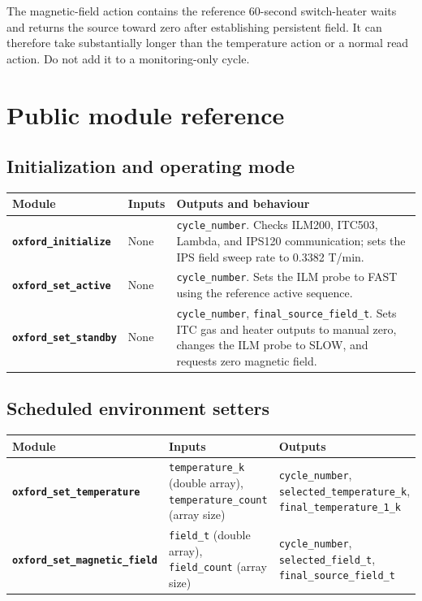 \documentclass[10pt,a4paper]{article}
\newcommand{\api}[1]{\nolinkurl{#1}}
\newcommand{\module}[1]{\textcolor{OxfordBlue}{\textbf{\api{#1}}}}
\begin{document}
\begin{warningbox}
The magnetic-field action contains the reference 60-second switch-heater
waits and returns the source toward zero after establishing persistent field.
It can therefore take substantially longer than the temperature action or a
normal read action. Do not add it to a monitoring-only cycle.
\end{warningbox}

\section{Public module reference}

\subsection{Initialization and operating mode}

\begin{longtable}{@{}>{\raggedright\arraybackslash}p{}
                        >{\raggedright\arraybackslash}p{}
                        >{\raggedright\arraybackslash}p{}@{}}
\toprule
\textbf{Module} & \textbf{Inputs} & \textbf{Outputs and behaviour} \\
\midrule
\endhead
\module{oxford_initialize} & None &
\api{cycle_number}. Checks ILM200, ITC503, Lambda, and IPS120 communication;
sets the IPS field sweep rate to 0.3382 T/min. \\
\addlinespace
\module{oxford_set_active} & None &
\api{cycle_number}. Sets the ILM probe to FAST using the reference active
sequence. \\
\addlinespace
\module{oxford_set_standby} & None &
\api{cycle_number}, \api{final_source_field_t}. Sets ITC gas and heater
outputs to manual zero, changes the ILM probe to SLOW, and requests zero
magnetic field. \\
\bottomrule
\end{longtable}

\subsection{Scheduled environment setters}

\begin{longtable}{@{}>{\raggedright\arraybackslash}p{}
                        >{\raggedright\arraybackslash}p{}
                        >{\raggedright\arraybackslash}p{}@{}}
\toprule
\textbf{Module} & \textbf{Inputs} & \textbf{Outputs} \\
\midrule
\endhead
\module{oxford_set_temperature} &
\api{temperature_k} (double array), \api{temperature_count} (array size) &
\api{cycle_number}, \api{selected_temperature_k},
\api{final_temperature_1_k} \\
\addlinespace
\module{oxford_set_magnetic_field} &
\api{field_t} (double array), \api{field_count} (array size) &
\api{cycle_number}, \api{selected_field_t},
\api{final_source_field_t} \\
\bottomrule
\end{longtable}
\end{document}
